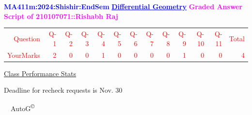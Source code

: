 \documentclass{article}                              %
\begin{document}
%
\vspace*{1in}

\begin{center}
	\textbf{\textcolor{blue}{\LARGE MA411m:2024:Shishir:EndSem}}
	\vskip 1cm
	\textbf{\textcolor{blue}{\underline{\Large Differential Geometry}}}
	\vskip 1cm
	\textbf{\textcolor{magenta}{\LARGE Graded Answer Script of 210107071::Rishabh Raj}}
\end{center}


\begin{center}
	\Huge 
	\textcolor{red}{
	\begin{tabular}{*{13}{r}}
		Question&Q-1& Q-2& Q-3& Q-4& Q-5& Q-6& Q-7& Q-8& Q-9& Q-10& Q-11&Total  \\
        	YourMarks&2&0&0&1&0&0&0&0&1&0&0&4
	\end{tabular}
	}
        \vskip 2cm
	\large
	\underline{Class Performance Stats}
	\DTLsetseparator{;}
	\begin{table}[htbp]
		\centering
	\end{table}
	\vskip 1cm
	Deadline for recheck requests is Nov. 30
\end{center}
\ \vfill \ \hfill \small AutoG\textsuperscript{\copyright}
\newpage
%
\end{document}

